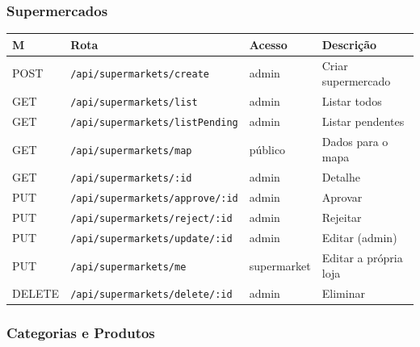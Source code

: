 \documentclass[12pt,a4paper]{article}
\begin{document}
\subsubsection{Supermercados}

\begin{center}
\begin{tabular}{llll}
\toprule
\textbf{M} & \textbf{Rota} & \textbf{Acesso} & \textbf{Descrição} \\
\midrule
POST   & \texttt{/api/supermarkets/create}         & admin & Criar supermercado \\
GET    & \texttt{/api/supermarkets/list}           & admin & Listar todos \\
GET    & \texttt{/api/supermarkets/listPending}    & admin & Listar pendentes \\
GET    & \texttt{/api/supermarkets/map}            & público & Dados para o mapa \\
GET    & \texttt{/api/supermarkets/:id}            & admin & Detalhe \\
PUT    & \texttt{/api/supermarkets/approve/:id}    & admin & Aprovar \\
PUT    & \texttt{/api/supermarkets/reject/:id}     & admin & Rejeitar \\
PUT    & \texttt{/api/supermarkets/update/:id}     & admin & Editar (admin) \\
PUT    & \texttt{/api/supermarkets/me}             & supermarket & Editar a própria loja \\
DELETE & \texttt{/api/supermarkets/delete/:id}     & admin & Eliminar \\
\bottomrule
\end{tabular}
\end{center}

\subsubsection{Categorias e Produtos}
\end{document}
